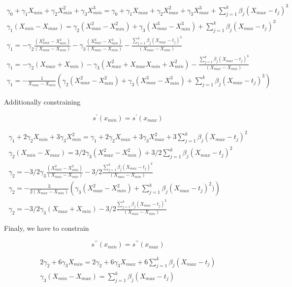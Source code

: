 \documentclass{article}
\begin{document}
\begin{gather*}
\gamma_0+\gamma_1 X_{min} + \gamma_2 X_{min}^2 + \gamma_3 X_{min}^3 = 
\gamma_0+\gamma_1 X_{max} + \gamma_2 X_{max}^2 + \gamma_3 X_{max}^3 + \sum_{j=1}^k\beta_j (X_{max}-t_j)^3 \\
\gamma_1 (X_{min}-X_{max}) = 
\gamma_2 (X_{max}^2-X_{min}^2) + \gamma_3 (X_{max}^3-X_{min}^3) + \sum_{j=1}^k\beta_j (X_{max}-t_j)^3 \\
\gamma_1  = - \gamma_2 \frac{(X_{max}^2-X_{min}^2)}{(X_{max}-X_{min})} - \gamma_3 \frac{(X_{max}^3-X_{min}^3)}{(X_{max}-X_{min})} - \frac{\sum_{j=1}^k\beta_j (X_{max}-t_j)^3}{(X_{max}-X_{min})} \\
\gamma_1  = - \gamma_2 (X_{max}+X_{min})- \gamma_3 (X_{max}^2+X_{max}X_{min}+X_{min}^2) - \frac{\sum_{j=1}^k\beta_j (X_{max}-t_j)^3}{(X_{max}-X_{min})} \\
\gamma_1  = -\frac{1}{X_{max}-X_{min}} \left(\gamma_2 (X^2_{max}-X^2_{min})+ \gamma_3 (X_{max}^3-X^3_{min}) + \sum_{j=1}^k\beta_j (X_{max}-t_j)^3\right)
\end{gather*}
    
Additionally constraining 

\[s^{\prime}(x_{min})=s^{\prime}(x_{max})\]

\begin{gather*}
\gamma_1 + 2\gamma_2 X_{min} + 3\gamma_3 X_{min}^2 = 
\gamma_1 + 2\gamma_2 X_{max} + 3\gamma_3 X_{max}^2 + 3\sum_{j=1}^k\beta_j (X_{max}-t_j)^2 \\
\gamma_2 (X_{min}-X_{max}) = 
  3/2\gamma_3 (X_{max}^2-X_{min}^2) + 3/2\sum_{j=1}^k\beta_j (X_{max}-t_j)^2 \\
\gamma_2  = 
  - 3/2 \gamma_3 \frac{(X_{max}^2-X_{min}^2)}{(X_{max}-X_{min})} - 3/2\frac{\sum_{j=1}^k\beta_j (X_{max}-t_j)^2}{(X_{max}-X_{min})} \\
\gamma_2=-\frac{3}{2 (X_{max}-X_{min})} \left( \gamma_3 (X^2_{max}-X^2_{min}) + \sum_{j=1}^k\beta_j (X_{max}-t_j)^2 )    \right) \\
\gamma_2  = 
  - 3/2 \gamma_3 (X_{max}+X_{min}) - 3/2\frac{\sum_{j=1}^k\beta_j (X_{max}-t_j)^2}{(X_{max}-X_{min})} 
\end{gather*}

Finaly, we have to constrain

\[ s^{\prime\prime}(x_{min})=s^{\prime\prime}(x_{max}) \]

\begin{gather*}
2\gamma_2  + 6\gamma_3 X_{min}=
2\gamma_2  + 6\gamma_3 X_{max} + 6\sum_{j=1}^k\beta_j (X_{max}-t_j) \\
\gamma_3 (X_{min}-X_{max})=\sum_{j=1}^k\beta_j (X_{max}-t_j)
\end{gather*}
\end{document}
